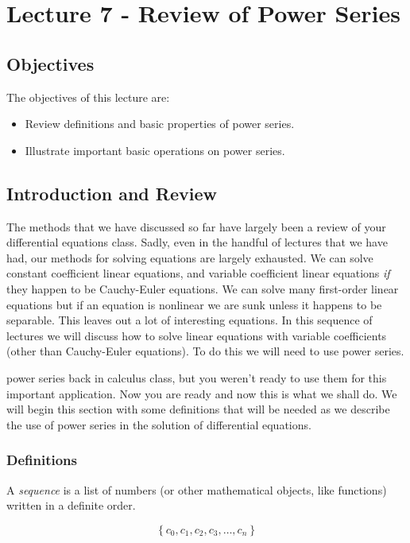 \chapter{Lecture 7 - Review of Power Series}
\label{ch:lec7}
\section{Objectives}
The objectives of this lecture are:
\begin{itemize}
\item Review definitions and basic properties of power series.
\item Illustrate important basic operations on power series.
\end{itemize}

\section{Introduction and Review}
The methods that we have discussed so far have largely been a review of your differential equations class.  Sadly, even in the handful of lectures that we have had, our methods for solving equations are largely exhausted.  We can solve constant coefficient linear equations, and variable coefficient linear equations \emph{if} they happen to be Cauchy-Euler equations.  We can solve many first-order linear equations but if an equation is nonlinear we are sunk unless it happens to be separable.  This leaves out a lot of interesting equations.  In this sequence of lectures we will discuss how to solve linear equations with variable coefficients (other than Cauchy-Euler equations).  To do this we will need to use power series. 

 power series back in calculus class, but you weren't ready to use them for this important application.  Now you are ready and now this is what we shall do.  We will begin this section with some definitions that will be needed as we describe the use of power series in the solution of differential equations.

\subsection{Definitions}
\begin{definition}[Sequence]
A \emph{sequence} is a list of numbers (or other mathematical objects, like functions) written in a definite order.

\begin{equation*}
\left\{c_0, c_1, c_2, c_3, \dots , c_n\right\}
\end{equation*}
\end{definition}

